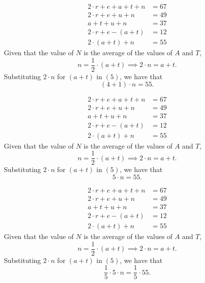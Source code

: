 \documentclass{beamer} %
\begin{document}
\setcounter{equation}{0}

\begin{frame}
  \begin{align}
    2\cdot r+e+a+t+n &= 67 \\
    2\cdot r+e+u+n &= 49   \\
    a+t+u+n &= 37          \\
    2\cdot r+e-(a+t) &= 12 \\
    2\cdot(a+t)+n &= 55
  \end{align}
  Given that the value of $N$ is the average of the values of $A$ and $T$,
  \[
    n=\frac{1}{2}\cdot(a+t) \implies 2 \cdot n = a + t.
  \]
  Substituting $2\cdot n$ for $(a+t)$ in $(5)$, we have that
  \[
    (4+1)\cdot n=55.
  \]
\end{frame}

\setcounter{equation}{0}

\begin{frame}
  \begin{align}
    2\cdot r+e+a+t+n &= 67 \\
    2\cdot r+e+u+n &= 49   \\
    a+t+u+n &= 37          \\
    2\cdot r+e-(a+t) &= 12 \\
    2\cdot(a+t)+n &= 55
  \end{align}
  Given that the value of $N$ is the average of the values of $A$ and $T$,
  \[
    n=\frac{1}{2}\cdot(a+t) \implies 2 \cdot n = a + t.
  \]
  Substituting $2\cdot n$ for $(a+t)$ in $(5)$, we have that
  \[
    5\cdot n = 55.
  \]
\end{frame}

\setcounter{equation}{0}

\begin{frame}
  \begin{align}
    2\cdot r+e+a+t+n &= 67 \\
    2\cdot r+e+u+n &= 49   \\
    a+t+u+n &= 37          \\
    2\cdot r+e-(a+t) &= 12 \\
    2\cdot(a+t)+n &= 55
  \end{align}
  Given that the value of $N$ is the average of the values of $A$ and $T$,
  \[
    n=\frac{1}{2}\cdot(a+t) \implies 2 \cdot n = a + t.
  \]
  Substituting $2\cdot n$ for $(a+t)$ in $(5)$, we have that
  \[
    \frac{1}{5}\cdot 5\cdot n = \frac{1}{5}\cdot 55.
  \]
\end{frame}
\end{document}
